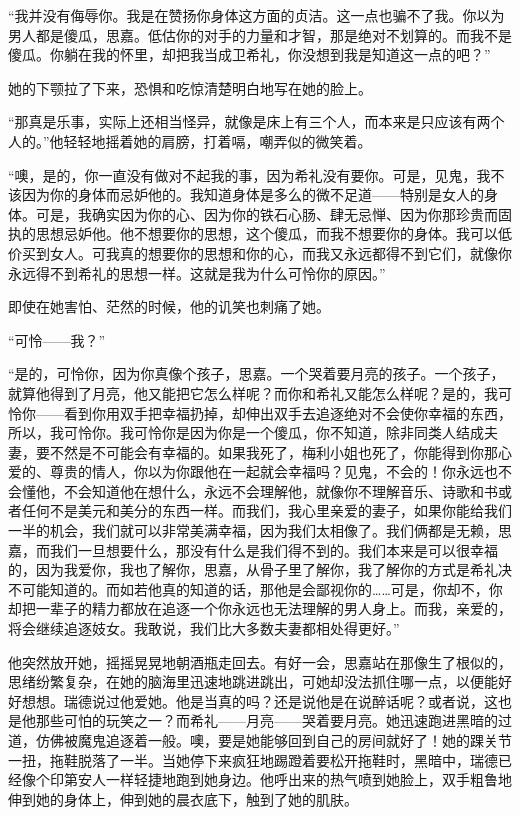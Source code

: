 \par “我并没有侮辱你。我是在赞扬你身体这方面的贞洁。这一点也骗不了我。你以为男人都是傻瓜，思嘉。低估你的对手的力量和才智，那是绝对不划算的。而我不是傻瓜。你躺在我的怀里，却把我当成卫希礼，你没想到我是知道这一点的吧？”
\par 她的下颚拉了下来，恐惧和吃惊清楚明白地写在她的脸上。
\par “那真是乐事，实际上还相当怪异，就像是床上有三个人，而本来是只应该有两个人的。”他轻轻地摇着她的肩膀，打着嗝，嘲弄似的微笑着。
\par “噢，是的，你一直没有做对不起我的事，因为希礼没有要你。可是，见鬼，我不该因为你的身体而忌妒他的。我知道身体是多么的微不足道——特别是女人的身体。可是，我确实因为你的心、因为你的铁石心肠、肆无忌惮、因为你那珍贵而固执的思想忌妒他。他不想要你的思想，这个傻瓜，而我不想要你的身体。我可以低价买到女人。可我真的想要你的思想和你的心，而我又永远都得不到它们，就像你永远得不到希礼的思想一样。这就是我为什么可怜你的原因。”
\par 即使在她害怕、茫然的时候，他的讥笑也刺痛了她。
\par “可怜——我？”
\par “是的，可怜你，因为你真像个孩子，思嘉。一个哭着要月亮的孩子。一个孩子，就算他得到了月亮，他又能把它怎么样呢？而你和希礼又能怎么样呢？是的，我可怜你——看到你用双手把幸福扔掉，却伸出双手去追逐绝对不会使你幸福的东西，所以，我可怜你。我可怜你是因为你是一个傻瓜，你不知道，除非同类人结成夫妻，要不然是不可能会有幸福的。如果我死了，梅利小姐也死了，你能得到你那心爱的、尊贵的情人，你以为你跟他在一起就会幸福吗？见鬼，不会的！你永远也不会懂他，不会知道他在想什么，永远不会理解他，就像你不理解音乐、诗歌和书或者任何不是美元和美分的东西一样。而我们，我心里亲爱的妻子，如果你能给我们一半的机会，我们就可以非常美满幸福，因为我们太相像了。我们俩都是无赖，思嘉，而我们一旦想要什么，那没有什么是我们得不到的。我们本来是可以很幸福的，因为我爱你，我也了解你，思嘉，从骨子里了解你，我了解你的方式是希礼决不可能知道的。而如若他真的知道的话，那他是会鄙视你的……可是，你却不，你却把一辈子的精力都放在追逐一个你永远也无法理解的男人身上。而我，亲爱的，将会继续追逐妓女。我敢说，我们比大多数夫妻都相处得更好。”
\par 他突然放开她，摇摇晃晃地朝酒瓶走回去。有好一会，思嘉站在那像生了根似的，思绪纷繁复杂，在她的脑海里迅速地跳进跳出，可她却没法抓住哪一点，以便能好好想想。瑞德说过他爱她。他是当真的吗？还是说他是在说醉话呢？或者说，这也是他那些可怕的玩笑之一？而希礼——月亮——哭着要月亮。她迅速跑进黑暗的过道，仿佛被魔鬼追逐着一般。噢，要是她能够回到自己的房间就好了！她的踝关节一扭，拖鞋脱落了一半。当她停下来疯狂地踢蹬着要松开拖鞋时，黑暗中，瑞德已经像个印第安人一样轻捷地跑到她身边。他呼出来的热气喷到她脸上，双手粗鲁地伸到她的身体上，伸到她的晨衣底下，触到了她的肌肤。
